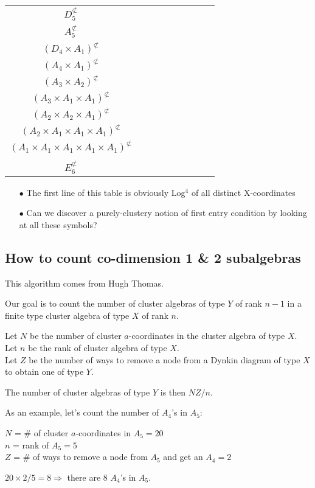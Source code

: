 \documentclass[12pt]{article}
\begin{document}
\begin{center}
\begin{tabular}{ c ||  c | c | c | c | c |  c | c | c |}
\cline{1-4} \(D_5^{\not\subset} \) & & &  \\ 
\cline{1-4} \(A_5^{\not\subset} \) & & &  \\ 
\cline{1-4} \((D_4 \times A_1)^{\not\subset} \) &  \\ 
\cline{1-2} \((A_4 \times A_1)^{\not\subset} \) &  \\ 
\cline{1-2} \((A_3 \times A_2)^{\not\subset} \) &  \\ 
\cline{1-2} \((A_3 \times A_1 \times A_1)^{\not\subset} \) & \\ 
\cline{1-2} \((A_2 \times A_2 \times A_1)^{\not\subset} \) & \\ 
\cline{1-2} \((A_2 \times A_1 \times A_1 \times A_1)^{\not\subset} \) & \\ 
\cline{1-2} \((A_1 \times A_1 \times A_1 \times A_1 \times A_1)^{\not\subset} \) & \\ \cline{1-2} \\[-.44cm]
\cline{1-2} \(E_6^{\not\subset} \) & \\ 
\cline{1-2}
\end{tabular}
\vspace{.6cm}


\begin{enumerate}
\item[$\bullet$] The first line of this table is obviously Log$^4$ of all distinct X-coordinates 
\item[$\bullet$] Can we discover a purely-clustery notion of first entry condition by looking at all these symbols?
\end{enumerate}

\end{center}

\pagebreak
\subsection*{How to count co-dimension 1 \& 2 subalgebras}

This algorithm comes from Hugh Thomas.

Our goal is to count the number of cluster algebras of type \(Y\) of rank \(n-1\) in a finite type cluster algebra of type \(X\) of rank \(n\).

Let \(N\) be the number of cluster \(a\)-coordinates in the cluster algebra of type \(X\).\\
Let \(n\) be the rank of cluster algebra of type \(X\).\\
Let \(Z\) be the number of ways to remove a node from a Dynkin diagram of type \(X\) to obtain one of type \(Y\).

The number of cluster algebras of type \(Y\) is then \(NZ/n\).

As an example, let's count the number of \(A_4\)'s in \(A_5\):

\(N\) = \# of cluster \(a\)-coordinates in \(A_5 = 20\)\\
\(n\) = rank of \(A_5 = 5\)\\
\(Z\) = \# of ways to remove a node from \(A_5\) and get an \(A_4 = 2\)

\(20\times2/5 = 8 \Rightarrow\) there are 8 \(A_4\)'s in \(A_5\).
\end{document}
